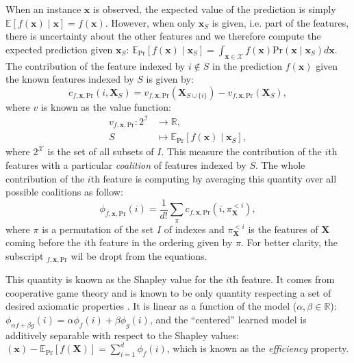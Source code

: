 \documentclass{article}
\theoremstyle{plain}
\theoremstyle{definition}
\theoremstyle{remark}
\begin{document}
When an instance $\bm{x}$ is observed, the expected value of the prediction is simply $\mathbb{E}[f(\bm{x}) \mid \bm{x}] = f(\bm{x})$. However, when only $\bm{x}_S$ is given, i.e. part of the features, there is uncertainty about the other features and we therefore compute the expected prediction given $\bm{x}_S$: $\mathbb{E}_{\text{Pr}}[f(\bm{x}) \mid \bm{x}_S] = \int_{\bm{x} \in \mathcal{X}}f(\bm{x})\text{Pr}(\bm{x} \mid \bm{x}_S)d\bm{x}$. The contribution of the feature indexed by $i \notin S$ in the prediction $f(\bm{x})$ given the known features indexed by $S$ is given by:
\begin{equation}
  \label{eq:contrib}
  c_{f,\bm{x},\text{Pr}}(i,\bm{X}_S) = v_{f,\bm{x},\text{Pr}}(\bm{X}_{S\cup\{i\}}) - v_{f,\bm{x},\text{Pr}}(\bm{X}_S),
\end{equation}
where $v$ is known as the value function:
\begin{equation}
  \label{eq:valuefunction}
  \begin{aligned}
    v_{f,\bm{x},\text{Pr}}: 2^{\mathcal{I}} &\to \mathbb{R},\\
    S &\mapsto \mathbb{E}_\text{Pr}[f(\bm{x})\mid \bm{x}_S],
  \end{aligned}
\end{equation}
where $2^{\mathcal{X}}$ is the set of all subsets of $I$. This measure the contribution of the $i$th features with a particular \emph{coalition} of features indexed by $S$. The whole contribution of the $i$th feature is computing by averaging this quantity over all possible coalitions as follow:
\begin{equation}
  \phi_{f,\bm{x},\text{Pr}}(i) = \frac{1}{d!} \sum_{\pi}c_{f,\bm{x},\text{Pr}}(i,\pi^{<i}_{\bm{X}}),
\end{equation}
where $\pi$ is a permutation of the set $I$ of indexes and $\pi^{<i}_{\bm{X}}$ is the features of $\bm{X}$ coming before the $i$th feature in the ordering given by $\pi$. For better clarity, the subscript $_{f,\bm{x},\text{Pr}}$ wil be dropt from the equations.

This quantity is known as the Shapley value for the $i$th feature. It comes from cooperative game theory and is known to be only quantity respecting a set of desired axiomatic properties \cite{shapley1953value}. It is linear as a function of the model ($\alpha, \beta \in \mathbb{R}$): $\phi_{\alpha f +\beta g}(i) = \alpha \phi_f(i) + \beta \phi_g(i)$, and the ``centered'' learned model is additively separable with respect to the Shapley values: $(\bm{x})-\mathbb{E}_{\text{Pr}}[f(\bm{X})] = \sum_{i=1}^{d} \phi_f(i)$, which is known as the \emph{efficiency} property.
\end{document}
